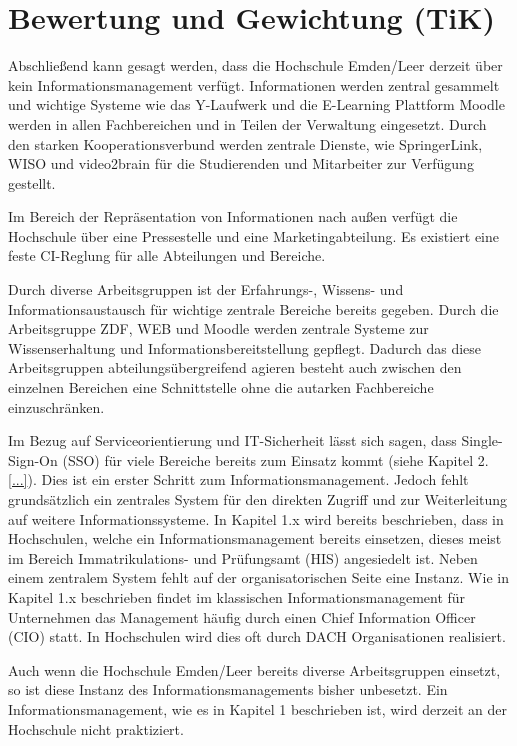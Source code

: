 \section{Bewertung und Gewichtung (TiK)}
Abschließend kann gesagt werden, dass die Hochschule Emden/Leer derzeit über kein Informationsmanagement verfügt. Informationen werden zentral gesammelt und wichtige Systeme wie das Y-Laufwerk und die E-Learning Plattform Moodle werden in allen Fachbereichen und in Teilen der Verwaltung eingesetzt. Durch den starken Kooperationsverbund werden zentrale Dienste, wie SpringerLink, WISO und video2brain für die Studierenden und Mitarbeiter zur Verfügung gestellt. 

Im Bereich der Repräsentation von Informationen nach außen verfügt die Hochschule über eine Pressestelle und eine Marketingabteilung. Es existiert eine feste CI-Reglung für alle Abteilungen und Bereiche. 

Durch diverse Arbeitsgruppen ist der Erfahrungs-, Wissens- und Informationsaustausch für wichtige zentrale Bereiche bereits gegeben. Durch die Arbeitsgruppe ZDF, WEB und Moodle werden zentrale Systeme zur Wissenserhaltung und Informationsbereitstellung gepflegt. Dadurch das diese Arbeitsgruppen abteilungsübergreifend agieren besteht auch zwischen den einzelnen Bereichen eine Schnittstelle ohne die autarken Fachbereiche einzuschränken. 

Im Bezug auf Serviceorientierung und IT-Sicherheit lässt sich sagen, dass Single-Sign-On (SSO) für viele Bereiche bereits zum Einsatz kommt (siehe Kapitel 2. \ref{...}). Dies ist ein erster Schritt zum Informationsmanagement. Jedoch fehlt grundsätzlich ein zentrales System für den direkten Zugriff und zur Weiterleitung auf weitere Informationssysteme. In Kapitel 1.x wird bereits beschrieben, dass in Hochschulen, welche ein Informationsmanagement bereits einsetzen, dieses meist im Bereich Immatrikulations- und Prüfungsamt (HIS) angesiedelt ist. 
Neben einem  zentralem System fehlt auf der organisatorischen Seite eine Instanz. Wie in Kapitel 1.x beschrieben findet im klassischen Informationsmanagement für Unternehmen das Management häufig durch einen Chief Information Officer (CIO) statt. In Hochschulen wird dies oft durch DACH Organisationen realisiert. 

Auch wenn die Hochschule Emden/Leer bereits diverse Arbeitsgruppen einsetzt, so ist diese Instanz des Informationsmanagements bisher unbesetzt. Ein Informationsmanagement, wie es in Kapitel 1 beschrieben ist, wird derzeit an der Hochschule nicht praktiziert. 

